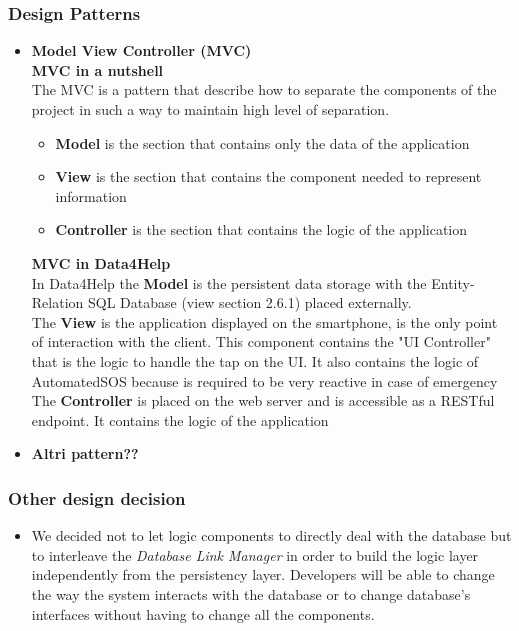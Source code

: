 \documentclass[DD.tex]{subfiles}
\begin{document}
\subsubsection{Design Patterns}

\begin{itemize}
	\item \textbf{Model View Controller (MVC)}\\
		\textbf{MVC in a nutshell}\\
		The MVC is a pattern that describe how to separate the components of the project in such a way to maintain high level of separation. \\
		\vspace{-5mm}
		\begin{itemize}
		\setlength\itemsep{-0.9em}
			\item\textbf{Model} is the section that contains only the data of the application\\
			\item\textbf{View} is the section that contains the component needed to represent information\\
			\item\textbf{Controller} is the section that contains the logic of the application\\
		\end{itemize}
		\textbf{MVC in Data4Help}\\
		In Data4Help the \textbf{Model} is the persistent data storage with the Entity-Relation SQL Database (view section 2.6.1) placed externally.\\
		The \textbf{View} is the application displayed on the smartphone, is the only point of interaction with the client.
		This component contains the "UI Controller" that is the logic to handle the tap on the UI. It also contains the logic of AutomatedSOS because is required to be very reactive in case of emergency \\
		The \textbf{Controller} is placed on the web server and is accessible as a RESTful endpoint. It contains the logic of the application \\
		\item \textbf{Altri pattern??}\\
\end{itemize}

\subsubsection{Other design decision}

\begin{itemize}
	\item We decided not to let logic components to directly deal with the database but to interleave the \textit{Database Link Manager} in order to build the logic layer independently from the persistency layer. Developers will be able to change the way the system interacts with the database or to change database's interfaces without having to change all the components. 
\end{itemize}
\end{document}
